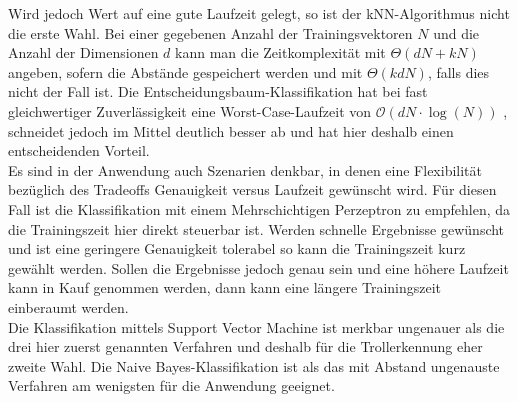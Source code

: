 Wird jedoch Wert auf eine gute Laufzeit gelegt, so ist der kNN-Algorithmus nicht die erste Wahl. Bei einer gegebenen Anzahl der Trainingsvektoren $N$ und die Anzahl der Dimensionen $d$ kann man die Zeitkomplexität mit $\Theta(dN + kN)$ angeben, sofern die Abstände gespeichert werden und mit $\Theta(kdN)$, falls dies nicht der Fall ist. Die Entscheidungsbaum-Klassifikation hat bei fast gleichwertiger Zuverlässigkeit eine Worst-Case-Laufzeit von $\mathcal{O}(d N \cdot \log(N))$ \citep{sani18}, schneidet jedoch im Mittel deutlich besser ab und hat hier deshalb einen entscheidenden Vorteil.\\
Es sind in der Anwendung auch Szenarien denkbar, in denen eine Flexibilität bezüglich des Tradeoffs Genauigkeit versus Laufzeit gewünscht wird. Für diesen Fall ist die Klassifikation mit einem Mehrschichtigen Perzeptron zu empfehlen, da die Trainingszeit hier direkt steuerbar ist. Werden schnelle Ergebnisse gewünscht und ist eine geringere Genauigkeit tolerabel so kann die Trainingszeit kurz gewählt werden. Sollen die Ergebnisse jedoch genau sein und eine höhere Laufzeit kann in Kauf genommen werden, dann kann eine längere Trainingszeit einberaumt werden.\\
Die Klassifikation mittels Support Vector Machine ist merkbar ungenauer als die drei hier zuerst genannten Verfahren und deshalb für die Trollerkennung eher zweite Wahl. Die Naive Bayes-Klassifikation ist als das mit Abstand ungenauste Verfahren am wenigsten für die Anwendung geeignet.
